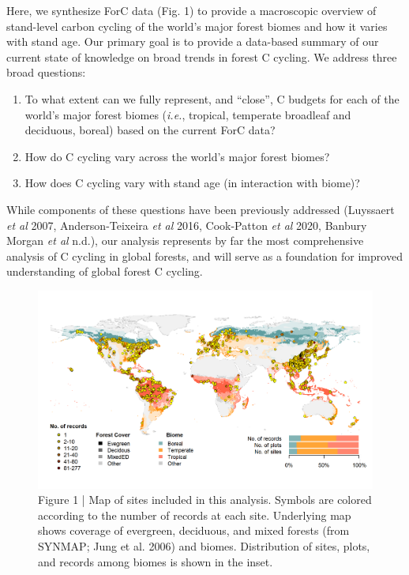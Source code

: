 \documentclass[
]{article}
\begin{document}
Here, we synthesize ForC data (Fig. 1) to provide a macroscopic overview
of stand-level carbon cycling of the world's major forest biomes and how
it varies with stand age. Our primary goal is to provide a data-based
summary of our current state of knowledge on broad trends in forest C
cycling. We address three broad questions:

\begin{enumerate}
\def\labelenumi{\arabic{enumi}.}
\item
  To what extent can we fully represent, and ``close'', C budgets for
  each of the world's major forest biomes (\emph{i.e.}, tropical,
  temperate broadleaf and deciduous, boreal) based on the current ForC
  data?
\item
  How do C cycling vary across the world's major forest biomes?
\item
  How does C cycling vary with stand age (in interaction with biome)?
\end{enumerate}

While components of these questions have been previously addressed
(Luyssaert \emph{et al} 2007, Anderson-Teixeira \emph{et al} 2016,
Cook-Patton \emph{et al} 2020, Banbury Morgan \emph{et al} n.d.), our
analysis represents by far the most comprehensive analysis of C cycling
in global forests, and will serve as a foundation for improved
understanding of global forest C cycling.

\begin{figure}[H]

{\centering \includegraphics[width=1\linewidth]{tables_figures/World_Map_records_in_Biomes} 

}

\caption{Figure 1 | Map of sites included in this analysis. Symbols are colored according to the number of records at each site. Underlying map shows coverage of evergreen, deciduous, and mixed forests (from SYNMAP; Jung et al. 2006) and biomes. Distribution of sites, plots, and records among biomes is shown in the inset.}\label{fig:unnamed-chunk-4}
\end{figure}
\end{document}
